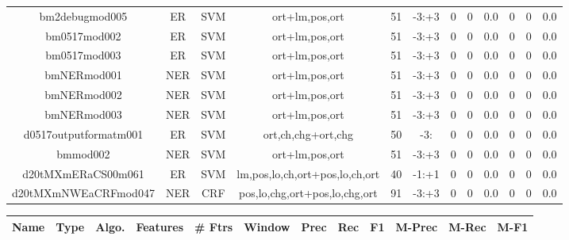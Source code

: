 \documentclass[a4paper]{article}
\begin{document}
\begin{landscape}
\begin{center}
\begin{tabular}{ |c|c|c|c|c|c|c|c|c|c|c|c|}
 
 	
 	\small{ bm2debugmod005 } & ER & SVM & ort+lm,pos,ort  &  51 &  -3:+3  &  0 & 0 & 0.0  &  0 & 0 & 0.0 \\
 	

 
 	
 	\small{ bm0517mod002 } & ER & SVM & ort+lm,pos,ort  &  51 &  -3:+3  &  0 & 0 & 0.0  &  0 & 0 & 0.0 \\
 	

 
 	
 	\small{ bm0517mod003 } & ER & SVM & ort+lm,pos,ort  &  51 &  -3:+3  &  0 & 0 & 0.0  &  0 & 0 & 0.0 \\
 	

 
 	
 	\small{ bmNERmod001 } & NER & SVM & ort+lm,pos,ort  &  51 &  -3:+3  &  0 & 0 & 0.0  &  0 & 0 & 0.0 \\
 	

 
 	
 	\small{ bmNERmod002 } & NER & SVM & ort+lm,pos,ort  &  51 &  -3:+3  &  0 & 0 & 0.0  &  0 & 0 & 0.0 \\
 	

 
 	
 	\small{ bmNERmod003 } & NER & SVM & ort+lm,pos,ort  &  51 &  -3:+3  &  0 & 0 & 0.0  &  0 & 0 & 0.0 \\
 	

 
 	
 	\small{ d0517outputformatm001 } & ER & SVM & ort,ch,chg+ort,chg  &  50 &  -3:  &  0 & 0 & 0.0  &  0 & 0 & 0.0 \\
 	

 
 	
 	\small{ bmmod002 } & NER & SVM & ort+lm,pos,ort  &  51 &  -3:+3  &  0 & 0 & 0.0  &  0 & 0 & 0.0 \\
 	

 
 	
 	\small{ d20tMXmERaCS00m061 } & ER & SVM & lm,pos,lo,ch,ort+pos,lo,ch,ort  &  40 &  -1:+1  &  0 & 0 & 0.0  &  0 & 0 & 0.0 \\
 	

 
 	
 	\small{ d20tMXmNWEaCRFmod047 } & NER & CRF & pos,lo,chg,ort+pos,lo,chg,ort  &  91 &  -3:+3  &  0 & 0 & 0.0  &  0 & 0 & 0.0 \\
 	
 \hline
\end{tabular}
\end{center}




\begin{center}
\begin{tabular}{ |c|c|c|c|c|c|c|c|c|c|c|c|} 
 \hline
 	Name & Type & Algo. & Features & \# Ftrs & Window & Prec & Rec & F1 & M-Prec & M-Rec & M-F1\\
 \hline


\end{tabular}
\end{center}
\end{landscape}
\end{document}
